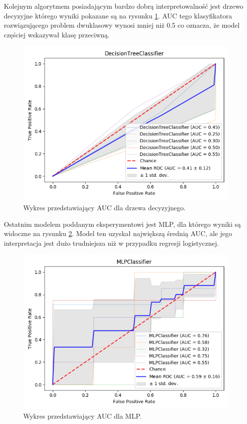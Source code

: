 \documentclass[a4paper,twoside,12pt]{book}
\begin{document}
Kolejnym algorytmem posiadającym bardzo dobrą interpretowalność jest drzewo decyzyjne którego wyniki pokazane są na rysunku \ref{fig:plot_tree}. AUC tego klasyfikatora rozwiązującego problem dwuklasowy wynosi mniej niż 0.5 co oznacza, że model częściej wskazywał klasę przeciwną.
\begin{figure}[h!]
    \centering
    \includegraphics[width=\textwidth]{images/tree.png}
    \caption{Wykres przedstawiający AUC dla drzewa decyzyjnego.}
    \label{fig:plot_tree}
\end{figure}

Ostatnim modelem poddanym eksperymentowi jest MLP, dla którego wyniki są widoczne na rysunku \ref{fig:plot_mlp}. Model ten uzyskał największą średnią AUC, ale jego interpretacja jest dużo trudniejsza niż w przypadku regresji logistycznej.
\begin{figure}[h!]
    \centering
    \includegraphics[width=\textwidth]{images/mlp.png}
    \caption{Wykres przedstawiający AUC dla MLP.}
    \label{fig:plot_mlp}
\end{figure}
\end{document}
